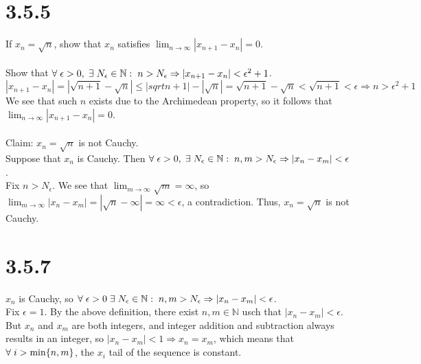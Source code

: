 \documentclass[11pt]{article}
\begin{document}
\section*{3.5.5}
If $x_n=\sqrt{n}$, show that $x_n$ satisfies $\lim_{n\to\infty}|x_{n+1}-x_n| = 0$. \\
\\
Show that $\forall \hspace{1mm} \epsilon > 0, \hspace{1mm} \exists \hspace{1mm} N_{\epsilon}\in\mathbb{N}: \hspace{1mm} n>N_{\epsilon} \Rightarrow |x_{n+1} - x_n| < \epsilon^2 + 1$.
\[|x_{n+1}-x_n|=|\sqrt{n+1}-\sqrt{n}| \leq |sqrt{n+1}|-|\sqrt{n}|=\sqrt{n+1}-\sqrt{n} < \sqrt{n+1} < \epsilon \Rightarrow n > \epsilon^2 + 1\]
We see that such $n$ exists due to the Archimedean property, so it follows that $\lim_{n\to\infty}|x_{n+1}-x_n|=0$. \\
\\
Claim: $x_n=\sqrt{n}$ is not Cauchy. \\
Suppose that $x_n$ is Cauchy. Then $\forall \hspace{1mm}\epsilon > 0, \hspace{1mm}\exists\hspace{1mm} N_{\epsilon} \in \mathbb{N}: \hspace{1mm} n,m > N_{\epsilon} \Rightarrow |x_n-x_m| < \epsilon$. \\
Fix $n > N_{\epsilon}$. We see that $\lim_{m\to\infty}\sqrt{m}=\infty$, so $\lim_{m\to\infty}|x_n-x_m| = |\sqrt{n}-\infty|=\infty < \epsilon$, a contradiction. Thus, $x_n=\sqrt{n}$ is not Cauchy.

\section*{3.5.7}
$x_n$ is Cauchy, so $\forall \hspace{1mm} \epsilon > 0 \hspace{1mm}\exists\hspace{1mm} N_{\epsilon} \in\mathbb{N}: \hspace{1mm} n,m > N_{\epsilon} \Rightarrow |x_n-x_m| < \epsilon$. \\
Fix $\epsilon=1$. By the above definition, there exist $n,m\in\mathbb{N}$ usch that $|x_n-x_m| < \epsilon$. But $x_n$ and $x_m$ are both integers, and integer addition and subtraction always results in an integer, so $|x_n-x_m|<1 \Rightarrow x_n=x_m$, which means that $\forall \hspace{1mm} i>\min\{n,m\}$, the $x_i$ tail of the sequence is constant.
\end{document}
